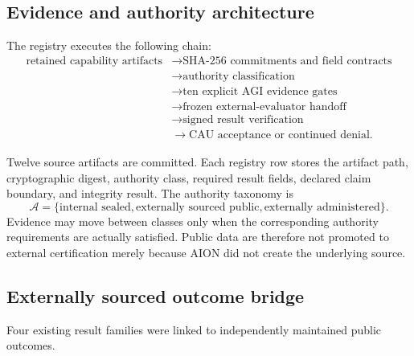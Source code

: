 \subsection{Evidence and authority architecture}
\label{subsec:agi-registry-architecture}

The registry executes the following chain:
\begin{equation}
\begin{split}
\text{retained capability artifacts}
&\rightarrow \text{SHA-256 commitments and field contracts} \\
&\rightarrow \text{authority classification} \\
&\rightarrow \text{ten explicit AGI evidence gates} \\
&\rightarrow \text{frozen external-evaluator handoff} \\
&\rightarrow \text{signed result verification} \\
&\rightarrow \text{CAU acceptance or continued denial}.
\end{split}
\label{eq:agi-registry-pipeline}
\end{equation}

Twelve source artifacts are committed.  Each registry row stores the artifact
path, cryptographic digest, authority class, required result fields, declared
claim boundary, and integrity result.  The authority taxonomy is
\begin{equation}
\mathcal{A}=\{
  \text{internal sealed},
  \text{externally sourced public},
  \text{externally administered}
\}.
\label{eq:agi-authority-classes}
\end{equation}
Evidence may move between classes only when the corresponding authority
requirements are actually satisfied.  Public data are therefore not promoted
to external certification merely because AION did not create the underlying
source.


\subsection{Externally sourced outcome bridge}
\label{subsec:external-outcome-bridge}

Four existing result families were linked to independently maintained public
outcomes.

